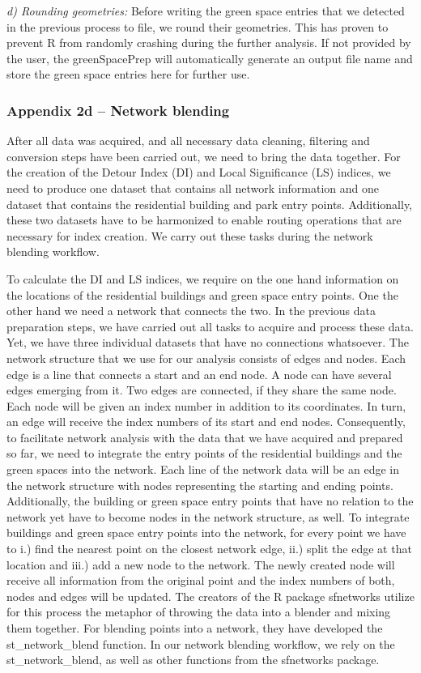 \documentclass[10pt]{article}
\begin{document}
\textit{d) Rounding geometries:} Before writing the green space entries that we detected in the previous process to file, we round their geometries. This has proven to prevent R from randomly crashing during the further analysis. If not provided by the user, the greenSpacePrep will automatically generate an output file name and store the green space entries here for further use. 

\subsubsection{Appendix 2d – Network blending}

After all data was acquired, and all necessary data cleaning, filtering and conversion steps have been carried out, we need to bring the data together.
For the creation of the Detour Index (DI) and Local Significance (LS) indices, we need to produce one dataset that contains all network information and one dataset that contains the residential building and park entry points.
Additionally, these two datasets have to be harmonized to enable routing operations that are necessary for index creation.
We carry out these tasks during the network blending workflow.

To calculate the DI and LS indices, we require on the one hand information on the locations of the residential buildings and green space entry points.
One the other hand we need a network that connects the two.
In the previous data preparation steps, we have carried out all tasks to acquire and process these data.
Yet, we have three individual datasets that have no connections whatsoever.
The network structure that we use for our analysis consists of edges and nodes. 
Each edge is a line that connects a start and an end node.
A node can have several edges emerging from it.
Two edges are connected, if they share the same node.
Each node will be given an index number in addition to its coordinates.
In turn, an edge will receive the index numbers of its start and end nodes. 
Consequently, to facilitate network analysis with the data that we have acquired and prepared so far, we need to integrate the entry points of the residential buildings and the green spaces into the network.
Each line of the network data will be an edge in the network structure with nodes representing the starting and ending points.
Additionally, the building or green space entry points that have no relation to the network yet have to become nodes in the network structure, as well.
To integrate buildings and green space entry points into the network, for every point we have to i.) find the nearest point on the closest network edge, ii.) split the edge at that location and iii.) add a new node to the network.
The newly created node will receive all information from the original point and the index numbers of both, nodes and edges will be updated.
The creators of the R package sfnetworks utilize for this process the metaphor of throwing the data into a blender and mixing them together.
For blending points into a network, they have developed the st\_network\_blend function.
In our network blending workflow, we rely on the st\_network\_blend, as well as other functions from the sfnetworks package.
\end{document}
